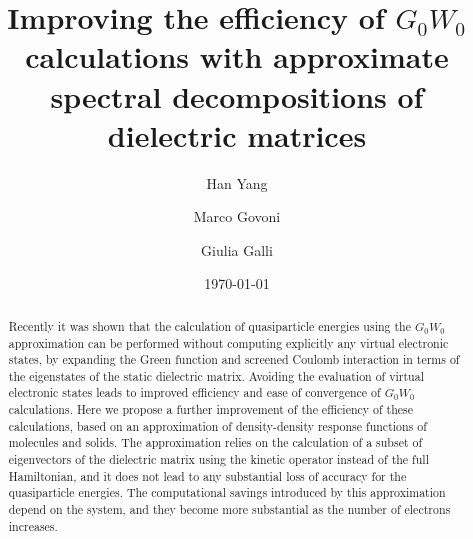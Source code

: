 \documentclass[aip,preprint]{revtex4-1}
\begin{document}
\title{Improving the efficiency of $G_0W_0$ calculations with approximate spectral decompositions of dielectric matrices}%

\author{Han Yang}

\author{Marco Govoni}


\author{Giulia Galli}

\date{\today}

\begin{abstract}
Recently it was shown that the calculation of quasiparticle energies using the $G_0W_0$ approximation can be performed without computing explicitly any virtual electronic states, by expanding the Green function and screened Coulomb interaction in terms of the eigenstates of the static dielectric matrix. Avoiding the evaluation of virtual electronic states leads to improved efficiency and  ease of convergence of $G_0W_0$ calculations. Here we propose a further improvement of the efficiency of these calculations, based on an approximation of density-density response functions of molecules and solids. The approximation relies on the calculation of a subset of eigenvectors of the dielectric matrix using the kinetic operator instead of the full Hamiltonian, and it does not lead to any substantial loss of accuracy for the quasiparticle energies.  The computational savings introduced by this approximation depend on the system, and they become more substantial as the number of electrons increases.
\end{abstract}

\end{document}
